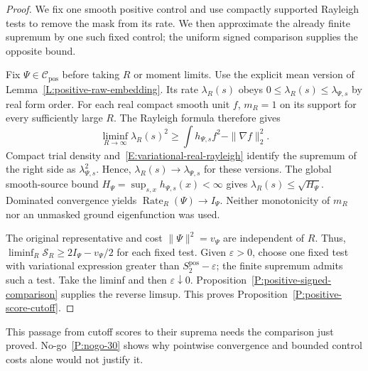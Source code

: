 \begin{proof}
  We fix one smooth positive control and use compactly supported Rayleigh
  tests to remove the mask from its rate. We then approximate the already
  finite supremum by one such fixed control; the uniform signed comparison
  supplies the opposite bound.

  Fix $\Psi \in \mathcal{C}_{\mathrm{pos}}$ before taking $R$ or moment limits.
  Use the explicit mean version of Lemma~\ref{L:positive-raw-embedding}. Its
  rate $\lambda_R(s)$ obeys $0 \le \lambda_R(s) \le \lambda_{\Psi,s}$ by real
  form order. For each real compact smooth unit $f$, $m_R = 1$ on its support
  for every sufficiently large $R$. The Rayleigh formula therefore gives
  \[
    \liminf_{R\to\infty}\lambda_R(s)^2
    \ge\int h_{\Psi,s}f^2-\|\nabla f\|_2^2.
  \]
  Compact trial density and~\eqref{E:variational-real-rayleigh} identify the
  supremum of the right side as $\lambda_{\Psi,s}^2$. Hence, $\lambda_R(s) \to
  \lambda_{\Psi,s}$ for these versions. The global smooth-source bound $H_\Psi =
  \sup_{s,x}h_{\Psi,s}(x) < \infty$ gives $\lambda_R(s) \le \sqrt{H_\Psi}$.
  Dominated convergence yields $\operatorname{Rate}_R(\Psi) \to I_\Psi$. Neither
  monotonicity of $m_R$ nor an unmasked ground eigenfunction was used.


  The original representative and cost $\|\Psi\|^2 = v_\Psi$ are independent of
  $R$. Thus, $\liminf_R\mathcal{S}_R \ge 2I_\Psi-v_\Psi/2$ for each fixed test.
  Given $\varepsilon > 0$, choose one fixed test with variational expression
  greater than $S_2^{\mathrm{pos}}-\varepsilon$; the finite supremum admits such
  a test. Take the liminf and then $\varepsilon\downarrow0$.
  Proposition~\ref{P:positive-signed-comparison} supplies the reverse limsup.
  This proves Proposition~\ref{P:positive-score-cutoff}.
\end{proof}

This passage from cutoff scores to their suprema needs the comparison
just proved. No-go~\ref{P:nogo-30} shows why pointwise convergence and
bounded control costs alone would not justify it.



